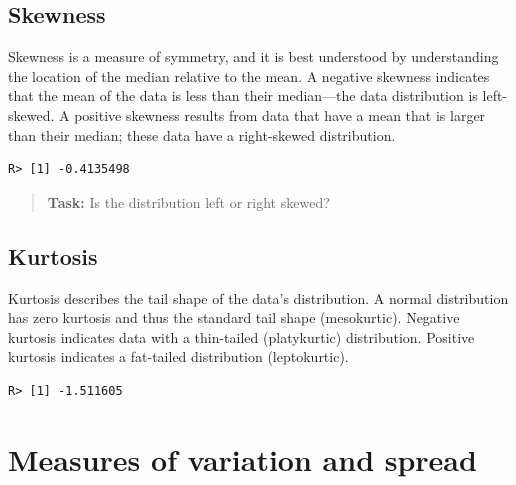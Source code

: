 \documentclass[english,10pt,a4paper,oneside]{book}
\newenvironment{Shaded}{\begin{snugshade}}{\end{snugshade}}
\newcommand{\KeywordTok}[1]{\textcolor[rgb]{0.13,0.29,0.53}{\textbf{#1}}}
\newcommand{\CommentTok}[1]{\textcolor[rgb]{0.56,0.35,0.01}{\textit{#1}}}
\newcommand{\OperatorTok}[1]{\textcolor[rgb]{0.81,0.36,0.00}{\textbf{#1}}}
\newcommand{\NormalTok}[1]{#1}
\theoremstyle{definition}
\theoremstyle{definition}
\theoremstyle{definition}
\theoremstyle{remark}
\begin{document}
\subsection{Skewness}\label{skewness}

Skewness is a measure of symmetry, and it is best understood by
understanding the location of the median relative to the mean. A
negative skewness indicates that the mean of the data is less than their
median---the data distribution is left-skewed. A positive skewness
results from data that have a mean that is larger than their median;
these data have a right-skewed distribution.

\begin{Shaded}
\end{Shaded}

\begin{verbatim}
R> [1] -0.4135498
\end{verbatim}

\begin{quote}
\textbf{Task:} Is the distribution left or right skewed?
\end{quote}

\subsection{Kurtosis}\label{kurtosis}

Kurtosis describes the tail shape of the data's distribution. A normal
distribution has zero kurtosis and thus the standard tail shape
(mesokurtic). Negative kurtosis indicates data with a thin-tailed
(platykurtic) distribution. Positive kurtosis indicates a fat-tailed
distribution (leptokurtic).

\begin{Shaded}
\end{Shaded}

\begin{verbatim}
R> [1] -1.511605
\end{verbatim}

\section{Measures of variation and
spread}\label{measures-of-variation-and-spread}
\end{document}
